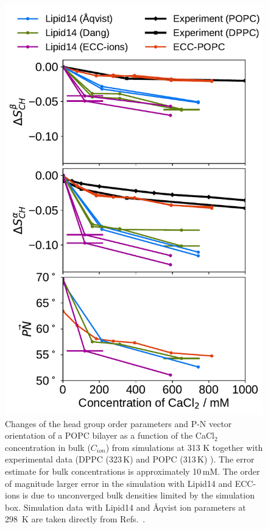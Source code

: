 \documentclass[12pt,a4paper,twoside,openright]{report}
\begin{document}
\begin{figure}[tbp!] 
  \centering 
  \includegraphics[width=\figwidth]{../img/ecc_popc/OrdPars-A-B-PNvec_L14-ECC-lipids_CaCl.pdf}
  \caption{\label{fig:delta_ordPar_CaCl} 
    Changes of the head group order parameters and P-N vector orientation of a POPC bilayer  
    as a function of the CaCl$_2$ concentration in bulk ($C_{ion}$) 
    from simulations at 313 K together with experimental data  
    (DPPC (323\,K) \citep{akutsu81} and POPC (313\,K) \citep{altenbach84}).  
    The error estimate for bulk concentrations is approximately 10\,mM. 
    The order of magnitude larger error in the
    simulation with Lipid14 and ECC-ions is due to unconverged bulk densities limited by the simulation box.  
    Simulation data with Lipid14 and Åqvist ion parameters at 298~K are taken directly from 
    Refs.~\citep{lipid14POPC0mMNaClfiles,lipid14POPC350mMCaClfiles,lipid14POPC350mMCaClfilesNC}. 
  } 
\end{figure} 
\end{document}
